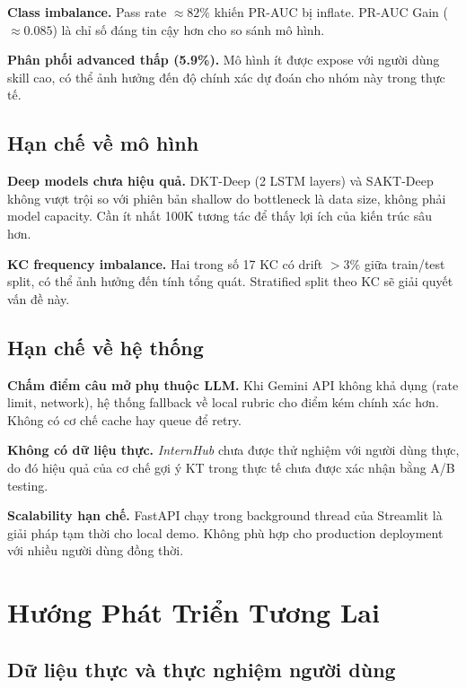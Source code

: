 \documentclass[12pt, a4paper]{report}
\newcommand{\system}{\textit{InternHub}}
\begin{document}
\textbf{Class imbalance.} Pass rate $\approx 82\%$ khiến PR-AUC bị inflate. PR-AUC Gain ($\approx 0.085$) là chỉ số đáng tin cậy hơn cho so sánh mô hình.

\textbf{Phân phối advanced thấp (5.9\%).} Mô hình ít được expose với người dùng skill cao, có thể ảnh hưởng đến độ chính xác dự đoán cho nhóm này trong thực tế.

\subsection{Hạn chế về mô hình}

\textbf{Deep models chưa hiệu quả.} DKT-Deep (2 LSTM layers) và SAKT-Deep không vượt trội so với phiên bản shallow do bottleneck là data size, không phải model capacity. Cần ít nhất 100K tương tác để thấy lợi ích của kiến trúc sâu hơn.

\textbf{KC frequency imbalance.} Hai trong số 17 KC có drift $> 3\%$ giữa train/test split, có thể ảnh hưởng đến tính tổng quát. Stratified split theo KC sẽ giải quyết vấn đề này.

\subsection{Hạn chế về hệ thống}

\textbf{Chấm điểm câu mở phụ thuộc LLM.} Khi Gemini API không khả dụng (rate limit, network), hệ thống fallback về local rubric cho điểm kém chính xác hơn. Không có cơ chế cache hay queue để retry.

\textbf{Không có dữ liệu thực.} \system{} chưa được thử nghiệm với người dùng thực, do đó hiệu quả của cơ chế gợi ý KT trong thực tế chưa được xác nhận bằng A/B testing.

\textbf{Scalability hạn chế.} FastAPI chạy trong background thread của Streamlit là giải pháp tạm thời cho local demo. Không phù hợp cho production deployment với nhiều người dùng đồng thời.

\section{Hướng Phát Triển Tương Lai}
\label{sec:future_work}

\subsection{Dữ liệu thực và thực nghiệm người dùng}
\end{document}
